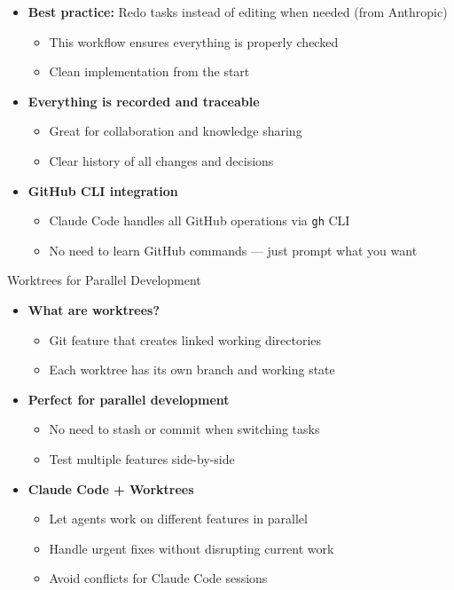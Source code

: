 \documentclass[aspectratio=169]{beamer}
\begin{document}
\begin{frame}

\begin{itemize}

\item \textbf{Best practice:} Redo tasks instead of editing when needed (from Anthropic)
\begin{itemize}
\item This workflow ensures everything is properly checked
\item Clean implementation from the start
\end{itemize}

\item \textbf{Everything is recorded and traceable}
\begin{itemize}
\item Great for collaboration and knowledge sharing
\item Clear history of all changes and decisions
\end{itemize}

\item \textbf{GitHub CLI integration}
\begin{itemize}
\item Claude Code handles all GitHub operations via \texttt{gh} CLI
\item No need to learn GitHub commands — just prompt what you want
\end{itemize}

\end{itemize}

\end{frame}

\begin{frame}{Worktrees for Parallel Development}

\begin{itemize}
\item \textbf{What are worktrees?}
\begin{itemize}
\item Git feature that creates linked working directories
\item Each worktree has its own branch and working state
\end{itemize}

\item \textbf{Perfect for parallel development}
\begin{itemize}
\item No need to stash or commit when switching tasks
\item Test multiple features side-by-side
\end{itemize}

\item \textbf{Claude Code + Worktrees}
\begin{itemize}
\item Let agents work on different features in parallel
\item Handle urgent fixes without disrupting current work
\item Avoid conflicts for Claude Code sessions
\end{itemize}
\end{itemize}
\end{frame}
\end{document}
